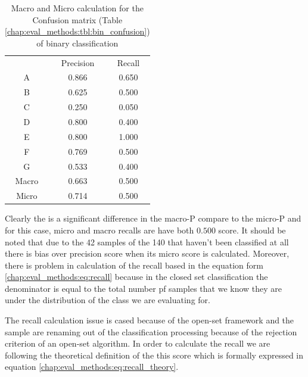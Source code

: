 {\begin{table}[H]
	\center
	\caption{Macro and Micro calculation for the Confusion matrix (Table \ref{chap:eval_methods:tbl:bin_confusion}) of binary classification}\label{chap:eval_methods:tbl:bin_macro_vs_micro}
	\begin{tabular}{l l l}
		\cline{2-3}
		& \multicolumn{1}{|c}{Precision} & \multicolumn{1}{c|}{Recall}\\
		\cline{1-3}
		\multicolumn{1}{|c}{A} & \multicolumn{1}{|c}{0.866} & \multicolumn{1}{c|}{0.650}\\
		\multicolumn{1}{|c}{B} & \multicolumn{1}{|c}{0.625} & \multicolumn{1}{c|}{0.500}\\
		\multicolumn{1}{|c}{C} & \multicolumn{1}{|c}{0.250} & \multicolumn{1}{c|}{0.050}\\
		\multicolumn{1}{|c}{D} & \multicolumn{1}{|c}{0.800} & \multicolumn{1}{c|}{0.400}\\
		\multicolumn{1}{|c}{E} & \multicolumn{1}{|c}{0.800} & \multicolumn{1}{c|}{1.000}\\
		\multicolumn{1}{|c}{F} & \multicolumn{1}{|c}{0.769} & \multicolumn{1}{c|}{0.500}\\
		\multicolumn{1}{|c}{G} & \multicolumn{1}{|c}{0.533} & \multicolumn{1}{c|}{0.400}\\
		\cline{1-3}
		\multicolumn{1}{|c}{Macro} & \multicolumn{1}{|c}{0.663} & \multicolumn{1}{c|}{0.500}\\
		\multicolumn{1}{|c}{Micro} & \multicolumn{1}{|c}{0.714} & \multicolumn{1}{c|}{0.500}\\
		\cline{1-3}
	\end{tabular}
\end{table}


Clearly the is a significant difference in the macro-P compare to the micro-P and for this case, micro and macro recalls are have both $0.500$ score. It should be noted that due to the 42 samples of the 140 that haven't been classified at all there is bias over precision score when its micro score is calculated. Moreover, there is problem in calculation of the recall based in the equation form \ref{chap:eval_methods:eq:recall} because in the closed set classification the denominator is equal to the total number pf samples that we know they are under the distribution of the class we are evaluating for. 

The recall calculation issue is cased because of the open-set framework and the sample are renaming out of the classification processing because of the rejection criterion of an open-set algorithm. In order to calculate the recall we are following the theoretical definition of the this score which is formally expressed in equation \ref{chap:eval_methods:eq:recall_theory}.

}
